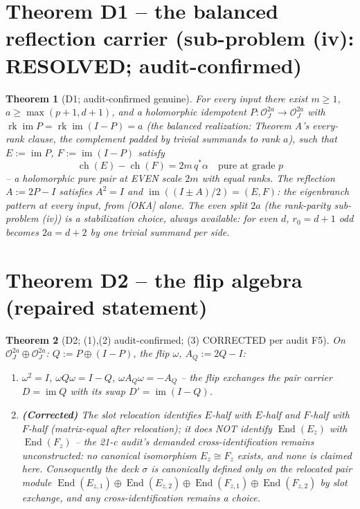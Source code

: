 \documentclass[11pt]{article}
\newtheorem{theorem}{Theorem}
\newcommand{\Oo}{\mathcal O}
\newcommand{\ch}{\operatorname{ch}}
\newcommand{\im}{\operatorname{im}}
\begin{document}
\section{Theorem D1 -- the balanced reflection carrier (sub-problem (iv): RESOLVED; audit-confirmed)}

\begin{theorem}[D1; audit-confirmed genuine]
For every input there exist $m\ge1$, $a\ge\max(p+1,d+1)$, and a holomorphic idempotent $P:\Oo_J^{2a}\to\Oo_J^{2a}$ with $\operatorname{rk}\im P=\operatorname{rk}\im(I-P)=a$ (the \emph{balanced} realization: Theorem A's every-rank clause, the complement padded by trivial summands to rank $a$), such that $E:=\im P$, $F:=\im(I-P)$ satisfy
\[
\ch(E)-\ch(F)=2m\,q^*\alpha \quad\text{pure at grade }p
\]
-- a holomorphic pure pair at EVEN scale $2m$ with equal ranks. The reflection $A:=2P-I$ satisfies $A^2=I$ and $\im((I\pm A)/2)=(E,F)$: the eigenbranch pattern at every input, from [OKA] alone. The even split $2a$ (the rank-parity sub-problem (iv)) is a stabilization choice, always available: for even $d$, $r_0=d+1$ odd becomes $2a=d+2$ by one trivial summand per side.
\end{theorem}

\section{Theorem D2 -- the flip algebra (repaired statement)}

\begin{theorem}[D2; (1),(2) audit-confirmed; (3) CORRECTED per audit F5]
On $\Oo_J^{2a}\oplus\Oo_J^{2a}$: $Q:=P\oplus(I-P)$, the flip $\omega$, $A_Q:=2Q-I$:
\begin{enumerate}
\item $\omega^2=I$, $\omega Q\omega=I-Q$, $\omega A_Q\omega=-A_Q$ -- the flip exchanges the pair carrier $D=\im Q$ with its swap $D'=\im(I-Q)$.
\item \textbf{(Corrected)} The slot relocation identifies $E$-half with $E$-half and $F$-half with $F$-half (matrix-equal after relocation); it does \emph{NOT} identify $\operatorname{End}(E_z)$ with $\operatorname{End}(F_z)$ -- the 21-c audit's demanded cross-identification remains \emph{unconstructed}: no canonical isomorphism $E_z\cong F_z$ exists, and none is claimed here. Consequently the deck $\sigma$ is canonically defined only on the \emph{relocated pair module} $\operatorname{End}(E_{z,1})\oplus\operatorname{End}(E_{z,2})\oplus\operatorname{End}(F_{z,1})\oplus\operatorname{End}(F_{z,2})$ by slot exchange, and any cross-identification remains a choice.
\end{enumerate}
\end{theorem}
\end{document}
